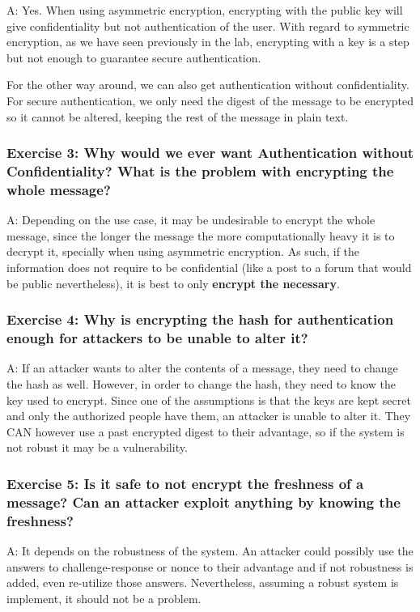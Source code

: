 \documentclass[12pt,a4paper]{article}
\begin{document}
A: Yes. When using asymmetric encryption, encrypting with the public key will give confidentiality but not authentication of the user. With regard to symmetric encryption, as we have seen previously in the lab, encrypting with a key is a step but not enough to guarantee secure authentication. 

For the other way around, we can also get authentication without confidentiality. For secure authentication, we only need the digest of the message to be encrypted so it cannot be altered, keeping the rest of the message in plain text.

\subsubsection*{Exercise 3: Why would we ever want Authentication without Confidentiality? What is the problem with encrypting the whole message?}

A: Depending on the use case, it may be undesirable to encrypt the whole message, since the longer the message the more computationally heavy it is to decrypt it, specially when using asymmetric encryption. As such, if the information does not require to be confidential (like a post to a forum that would be public nevertheless), it is best to only \textbf{encrypt the necessary}.

\subsubsection*{Exercise 4: Why is encrypting the hash for authentication enough for attackers to be unable to alter it?}

A: If an attacker wants to alter the contents of a message, they need to change the hash as well. However, in order to change the hash, they need to know the key used to encrypt. Since one of the assumptions is that the keys are kept secret and only the authorized people have them, an attacker is unable to alter it. They CAN however use a past encrypted digest to their advantage, so if the system is not robust it may be a vulnerability.

\subsubsection*{Exercise 5: Is it safe to not encrypt the freshness of a message? Can an attacker exploit anything by knowing the freshness? }

A: It depends on the robustness of the system. An attacker could possibly use the answers to challenge-response or nonce to their advantage and if not robustness is added, even re-utilize those answers. Nevertheless, assuming a robust system is implement, it should not be a problem.
\end{document}
